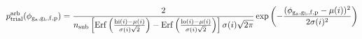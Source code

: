 \documentclass[12pt]{article}
\begin{document}
\begin{displaymath}
p_{\rm trial}^{\rm arb}(\phi_{\rm g_a,g_b,f,p}) = 
{
{2}
\over
{
n_{\rm sub}
\left[
{\rm Erf}\left({{{\rm hi}(i)-\mu(i)}\over{\sigma(i) \sqrt{2}}}\right)
- {\rm Erf}\left({{{\rm lo}(i)-\mu(i)}\over{\sigma(i) \sqrt{2}}}\right)
\right]
\sigma(i) \sqrt{2 \pi}
}
}
\exp\left(-{{(\phi_{\rm g_a,g_b,f,p} - \mu(i))^2}\over{2 \sigma(i)^2}}\right)
\end{displaymath}
\end{document}
